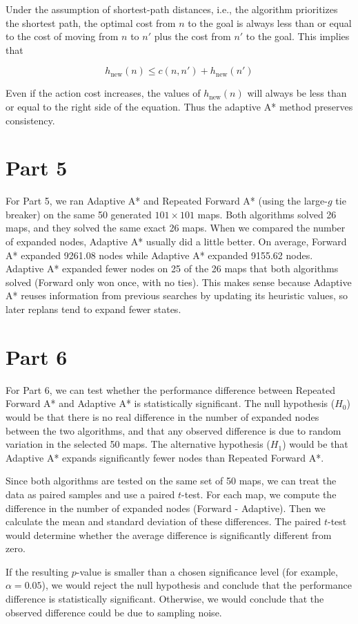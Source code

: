 \documentclass[11pt]{article}
\begin{document}
Under the assumption of shortest-path distances, i.e., the algorithm prioritizes the shortest path, the optimal cost from $n$ to the goal is always less than or equal to the cost of moving from $n$ to $n'$ plus the cost from $n'$ to the goal. This implies that

\[
h_{\text{new}}(n) \leq c(n, n') + h_{\text{new}}(n')
\]

Even if the action cost increases, the values of $h_{\text{new}}(n)$ will always be less than or equal to the right side of the equation. Thus the adaptive A* method preserves consistency.

\section*{Part 5}

For Part 5, we ran Adaptive A* and Repeated Forward A* (using the large-$g$ tie breaker) on the same 50 generated $101 \times 101$ maps. Both algorithms solved 26 maps, and they solved the same exact 26 maps. When we compared the number of expanded nodes, Adaptive A* usually did a little better. On average, Forward A* expanded 9261.08 nodes while Adaptive A* expanded 9155.62 nodes. Adaptive A* expanded fewer nodes on 25 of the 26 maps that both algorithms solved (Forward only won once, with no ties). This makes sense because Adaptive A* reuses information from previous searches by updating its heuristic values, so later replans tend to expand fewer states.

\section*{Part 6}

For Part 6, we can test whether the performance difference between Repeated Forward A* and Adaptive A* is statistically significant. The null hypothesis ($H_0$) would be that there is no real difference in the number of expanded nodes between the two algorithms, and that any observed difference is due to random variation in the selected 50 maps. The alternative hypothesis ($H_1$) would be that Adaptive A* expands significantly fewer nodes than Repeated Forward A*.

Since both algorithms are tested on the same set of 50 maps, we can treat the data as paired samples and use a paired $t$-test. For each map, we compute the difference in the number of expanded nodes (Forward - Adaptive). Then we calculate the mean and standard deviation of these differences. The paired $t$-test would determine whether the average difference is significantly different from zero.

If the resulting $p$-value is smaller than a chosen significance level (for example, $\alpha = 0.05$), we would reject the null hypothesis and conclude that the performance difference is statistically significant. Otherwise, we would conclude that the observed difference could be due to sampling noise.
\end{document}
